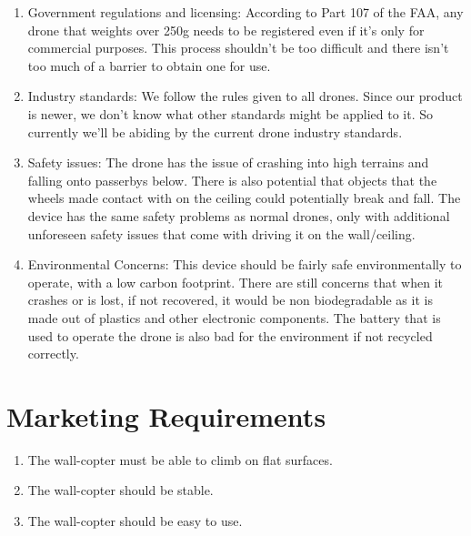 \documentclass[12pt]{article}
\begin{document}
\begin{enumerate}[label=\Alph*.]
\begin{enumerate}[label=\roman*.]
                \item Government regulations and licensing: According to Part 107 of the FAA, any drone that weights over 250g needs to be registered even if it's only for commercial purposes. This process shouldn't be too difficult and there isn't too much of a barrier to obtain one for use.
                \item Industry standards: We follow the rules given to all drones. Since our product is newer, we don't know what other standards might be applied to it. So currently we'll be abiding by the current drone industry standards.
                \item Safety issues: The drone has the issue of crashing into high terrains and falling onto passerbys below. There is also potential that objects that the wheels made contact with on the ceiling could potentially break and fall. The device has the same safety problems as normal drones, only with additional unforeseen safety issues that come with driving it on the wall/ceiling.
                \item Environmental Concerns: This device should be fairly safe environmentally to operate, with a low carbon footprint. There are still concerns that when it crashes or is lost, if not recovered, it would be non biodegradable as it is made out of plastics and other electronic components. The battery that is used to operate the drone is also bad for the environment if not recycled correctly.
            \end{enumerate}
        \end{enumerate}
    \newpage

    \section{Marketing Requirements}
        \begin{enumerate}[label=\arabic*.]
            \item The wall-copter must be able to climb on flat surfaces.
            \item The wall-copter should be stable.
            \item The wall-copter should be easy to use.
        \end{enumerate}
    
\end{document}
